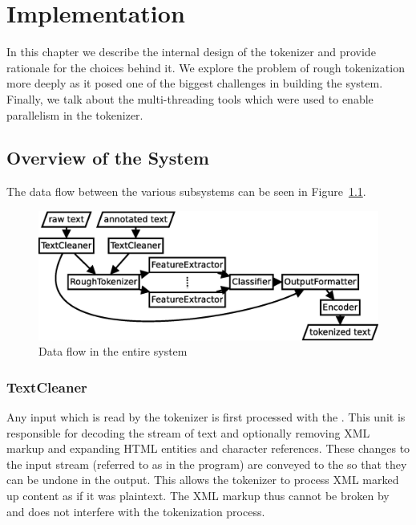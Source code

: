 \chapter{Implementation}
\label{chap:impl}

In this chapter we describe the internal design of the tokenizer and provide
rationale for the choices behind it. We explore the problem of rough
tokenization more deeply as it posed one of the biggest challenges in building
the system. Finally, we talk about the multi-threading tools which were used to
enable parallelism in the tokenizer.


\section{Overview of the System}
\label{sec:impl-overview}

The data flow between the various subsystems can be seen in
Figure~\ref{fig:all-parts}.

\begin{figure}
  \begin{center}
    \includegraphics[width=\textwidth]{img/all-parts.eps}
    \caption{Data flow in the entire system}
    \label{fig:all-parts}
  \end{center}
\end{figure}

\subsection{TextCleaner}
\label{ssec:impl-overview-textcleaner}

Any input which is read by the tokenizer is first processed with the
. This unit is responsible for decoding the stream of text
and optionally removing XML markup and expanding HTML entities and character
references. These changes to the input stream (referred to as 
in the program) are conveyed to the  so that they can be
undone in the output. This allows the tokenizer to process XML marked up
content as if it was plaintext. The XML markup thus cannot be broken by and
does not interfere with the tokenization process.

